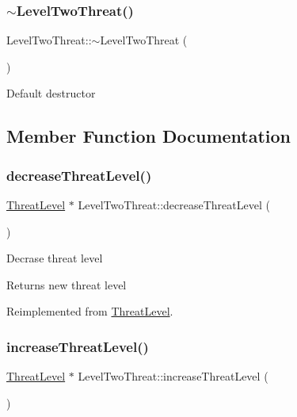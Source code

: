 \subsubsection{\texorpdfstring{$\sim$\+Level\+Two\+Threat()}{~LevelTwoThreat()}}
{\footnotesize\ttfamily Level\+Two\+Threat\+::$\sim$\+Level\+Two\+Threat (\begin{DoxyParamCaption}{ }\end{DoxyParamCaption})}

Default destructor 

\subsection{Member Function Documentation}
\mbox{\label{classLevelTwoThreat_a1d9e88b0f43396721a2f51ae67191359}} 
\subsubsection{\texorpdfstring{decrease\+Threat\+Level()}{decreaseThreatLevel()}}
{\footnotesize\ttfamily \hyperlink{classThreatLevel}{Threat\+Level} $\ast$ Level\+Two\+Threat\+::decrease\+Threat\+Level (\begin{DoxyParamCaption}{ }\end{DoxyParamCaption})\hspace{0.3cm}{\ttfamily [virtual]}}

Decrase threat level \begin{DoxyReturn}{Returns}
new threat level 
\end{DoxyReturn}


Reimplemented from \hyperlink{classThreatLevel_a3545ec161fbe4c01beafb9b43624c7e8}{Threat\+Level}.

\mbox{\label{classLevelTwoThreat_a54b4d396cdd27504f1a8063c04be5bcf}} 
\subsubsection{\texorpdfstring{increase\+Threat\+Level()}{increaseThreatLevel()}}
{\footnotesize\ttfamily \hyperlink{classThreatLevel}{Threat\+Level} $\ast$ Level\+Two\+Threat\+::increase\+Threat\+Level (\begin{DoxyParamCaption}{ }\end{DoxyParamCaption})\hspace{0.3cm}{\ttfamily [virtual]}}

